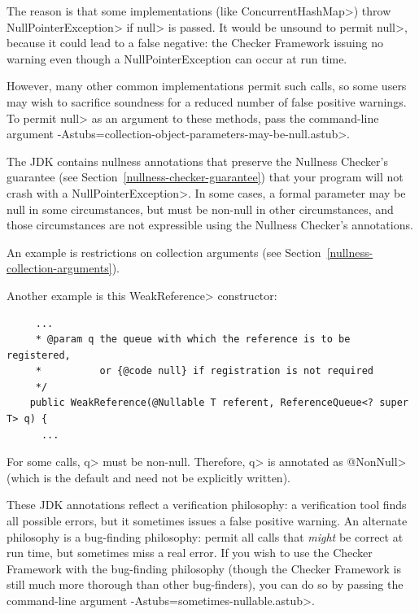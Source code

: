 The reason is that some implementations (like \<ConcurrentHashMap>) throw
\<NullPointerException> if \<null> is passed.  It would be unsound to
permit \<null>, because it could lead to a false negative:  the Checker
Framework issuing no warning even though a NullPointerException can occur
at run time.

However, many other common implementations permit such calls, so some users
may wish to sacrifice soundness for a reduced number of false positive
warnings.  To permit \<null> as an argument to these methods, pass the
command-line argument
\<-Astubs=collection-object-parameters-may-be-null.astub>.



The JDK contains nullness annotations that preserve the Nullness Checker's
guarantee (see Section~\ref{nullness-checker-guarantee}) that your program will not
crash with a \<NullPointerException>.  In some cases, a formal parameter
may be null in some circumstances, but must be non-null in other
circumstances, and those circumstances are not expressible using the
Nullness Checker's annotations.

An example is restrictions on collection arguments (see
Section~\ref{nullness-collection-arguments}).

Another example is this \<WeakReference> constructor:

\begin{Verbatim}
     ...
     * @param q the queue with which the reference is to be registered,
     *          or {@code null} if registration is not required
     */
    public WeakReference(@Nullable T referent, ReferenceQueue<? super T> q) {
      ...
\end{Verbatim}

For some calls, \<q> must be non-null.  Therefore, \<q> is annotated as
\<@NonNull> (which is the default and need not be explicitly written).

These JDK annotations reflect a verification philosophy:  a verification
tool finds all possible errors, but it sometimes issues a false positive warning.
An alternate philosophy is a bug-finding philosophy:  permit all calls that
\emph{might} be correct at run time, but sometimes miss a real error.  If
you wish to use the Checker Framework with the bug-finding philosophy
(though the Checker Framework is still much more thorough than other
bug-finders), you can do so by passing the command-line argument
\<-Astubs=sometimes-nullable.astub>.


